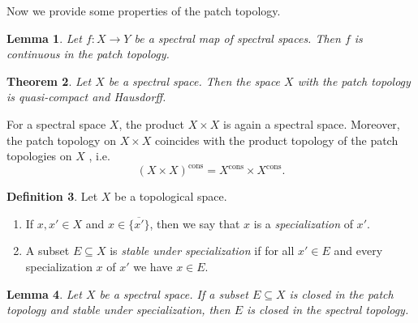 \documentclass[10pt, reqno]{amsart}
\theoremstyle{plain}
\newtheorem{theorem}{Theorem}[section]
\newtheorem{lemma}[theorem]{Lemma}
\theoremstyle{definition}
\newtheorem{definition}[theorem]{Definition}
\begin{document}
Now we provide some properties of the patch topology.
\begin{lemma}\cite[Section 08YF]{stacks-project}\label{spectrality_implies_continuity_in_the_patch_topology}
    Let $f: X \to Y$ be a spectral map of spectral spaces. Then $f$ is continuous in the patch topology. 
\end{lemma}
\begin{theorem}\cite[Theorem 1]{Hochster}\label{spectral_space_with_patch_top_is_compact}
    Let $X$ be a spectral space. Then the space $X$ with the patch topology is quasi-compact and Hausdorff. 
\end{theorem}
For a spectral space $X$, the product $X \times X$ is again a spectral space. Moreover, the patch topology on $X \times X$ coincides with the product topology of the patch topologies on $X$ \cite[Section 2]{PICAVET1986527}, i.e. $$(X \times X)^\mathrm{cons} = X^\mathrm{cons} \times X^\mathrm{cons}.$$
\begin{definition}\cite[Section 0060]{stacks-project}
    Let $X$ be a topological space. 
    \begin{enumerate}[label=(\arabic*)]
        \item If $x, x'\in X$ and $x \in \overline{\{x'\}}$, then we say that $x$ is a \emph{specialization} of $x'$. 
        \item A subset $E \subseteq X$ is \emph{stable under specialization} if for all $x' \in E$ and every specialization $x$ of $x'$ we have $x \in E$. 
    \end{enumerate}
\end{definition}
\begin{lemma}\cite[Section 08YF]{stacks-project}\label{closed_in_patch_and_stable_under_specialization_is_closed}
    Let $X$ be a spectral space. If a subset $E \subseteq X$ is closed in the patch topology and stable under specialization, then $E$ is closed in the spectral topology.
\end{lemma}
 
\end{document}
